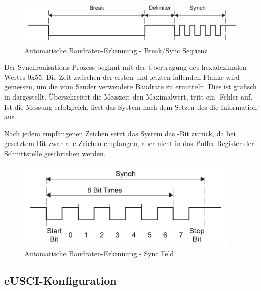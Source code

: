 \begin{figure}[h!]
	\centering
	\includegraphics[width=1.0\textwidth]{../Bilder/auto_baud.png}
	\caption{Automatische Baudraten-Erkennung - Break/Sync Sequenz\\}
	\label{fig:auto_baud}
\end{figure}

\newpage
Der Synchronisations-Prozess beginnt mit der \"Ubertragung des hexadezimalen Wertes 0x55. Die Zeit zwischen der ersten und letzten fallenden Flanke wird gemessen, um die vom Sender verwendete Baudrate zu ermitteln. Dies ist grafisch in  dargestellt. \"Uberschreitet die Messzeit den Maximalwert, tritt ein -Fehler auf. Ist die Messung erfolgreich, liest das System nach dem Setzen des  die Information aus. 

Nach jedem empfangenen Zeichen setzt das System das -Bit zur\"uck, da bei gesetztem Bit zwar alle Zeichen empfangen, aber nicht in das Puffer-Register der Schnittstelle geschrieben werden. 

\vspace{1cm}
\begin{figure}[h!]
	\centering
	\includegraphics[width=0.95\textwidth]{../Bilder/sync_field.png}
	\caption{Automatische Baudraten-Erkennung - Sync Feld\\}
	\label{fig:sync_field}
\end{figure}

\newpage
\subsection{eUSCI-Konfiguration}
\label{sec:eUSCI_Konfiguration}

